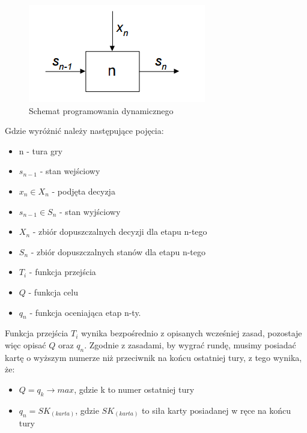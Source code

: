 \begin{figure}[h]
	\centering
	\includegraphics[]{Resources/Schemat_Strategii.png}
	\caption{Schemat programowania dynamicznego} \label{fig:Schemat_Strategii}
\end{figure}
Gdzie wyróżnić należy następujące pojęcia:
\begin{itemize}
	\item n - tura gry
	\item $s_{n-1}$ - stan wejściowy
	\item $x_n \in X_n$ - podjęta decyzja
	\item $s_{n-1} \in S_n$ - stan wyjściowy
	\item $X_n$ - zbiór dopuszczalnych decyzji dla etapu n-tego
	\item $S_n$ - zbiór dopuszczalnych stanów dla etapu n-tego
	\item $T_i$ - funkcja przejścia
	\item $Q$ - funkcja celu
	\item $q_n$ - funkcja oceniająca etap n-ty.
\end{itemize}
Funkcja przejścia $T_i$ wynika bezpośrednio z opisanych wcześniej zasad, pozostaje więc opisać $Q$ oraz $q_n$. Zgodnie z zasadami, by wygrać rundę, musimy posiadać kartę o wyższym numerze niż przeciwnik na końcu ostatniej tury, z tego wynika, że:
\begin{itemize}
	\item $Q = q_k \rightarrow max$, gdzie k to numer ostatniej tury
	\item $q_n = SK_{(karta)}$, gdzie $SK_{(karta)}$ to siła karty posiadanej w ręce na końcu tury
\end{itemize}


